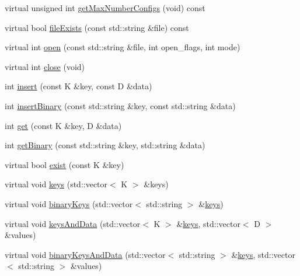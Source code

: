 \begin{DoxyCompactItemize}
\item 
virtual unsigned int \mbox{\hyperlink{classFILEDB_1_1ConfDataStoreDB_a89337b5034d8f87b4a37ceb05ea99d3a}{get\+Max\+Number\+Configs}} (void) const
\item 
virtual bool \mbox{\hyperlink{classFILEDB_1_1ConfDataStoreDB_aec1d15aa66421b99e7cd1151e12d2f17}{file\+Exists}} (const std\+::string \&file) const
\item 
virtual int \mbox{\hyperlink{classFILEDB_1_1ConfDataStoreDB_ab87e2fb12067bfb19c1f381a433fd442}{open}} (const std\+::string \&file, int open\+\_\+flags, int mode)
\item 
virtual int \mbox{\hyperlink{classFILEDB_1_1ConfDataStoreDB_aa322ea0136b8eacc11df2b5b52b3b6d5}{close}} (void)
\item 
int \mbox{\hyperlink{classFILEDB_1_1ConfDataStoreDB_a9917cff27ec340f88e59ddb9be630ecf}{insert}} (const K \&key, const D \&data)
\item 
int \mbox{\hyperlink{classFILEDB_1_1ConfDataStoreDB_a82fea8d8ac1a2c096614b213087a73d2}{insert\+Binary}} (const std\+::string \&key, const std\+::string \&data)
\item 
int \mbox{\hyperlink{classFILEDB_1_1ConfDataStoreDB_ad89d0c1aef7c82fb0273d50bfea7cf0a}{get}} (const K \&key, D \&data)
\item 
int \mbox{\hyperlink{classFILEDB_1_1ConfDataStoreDB_a971e372585c497dad3b1bc589bc4dd15}{get\+Binary}} (const std\+::string \&key, std\+::string \&data)
\item 
virtual bool \mbox{\hyperlink{classFILEDB_1_1ConfDataStoreDB_afedf2b2ec0b10469cebb72397b02459d}{exist}} (const K \&key)
\item 
virtual void \mbox{\hyperlink{classFILEDB_1_1ConfDataStoreDB_a794e05e3888ab95e0396a196b5a18e65}{keys}} (std\+::vector$<$ K $>$ \&keys)
\item 
virtual void \mbox{\hyperlink{classFILEDB_1_1ConfDataStoreDB_a1d0e8e27cd8fc6b24ece52259d1ab2b0}{binary\+Keys}} (std\+::vector$<$ std\+::string $>$ \&\mbox{\hyperlink{classFILEDB_1_1ConfDataStoreDB_a794e05e3888ab95e0396a196b5a18e65}{keys}})
\item 
virtual void \mbox{\hyperlink{classFILEDB_1_1ConfDataStoreDB_a94333e6aab463fd336bffb28d81dd39d}{keys\+And\+Data}} (std\+::vector$<$ K $>$ \&\mbox{\hyperlink{classFILEDB_1_1ConfDataStoreDB_a794e05e3888ab95e0396a196b5a18e65}{keys}}, std\+::vector$<$ D $>$ \&values)
\item 
virtual void \mbox{\hyperlink{classFILEDB_1_1ConfDataStoreDB_ae38beaf9ba3f8629f2c322a3c5a23357}{binary\+Keys\+And\+Data}} (std\+::vector$<$ std\+::string $>$ \&\mbox{\hyperlink{classFILEDB_1_1ConfDataStoreDB_a794e05e3888ab95e0396a196b5a18e65}{keys}}, std\+::vector$<$ std\+::string $>$ \&values)

\end{DoxyCompactItemize}
